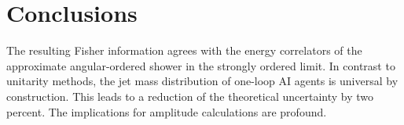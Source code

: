 \section{Conclusions}\label{sec:conclusions}

The resulting Fisher information agrees with the energy correlators of
the approximate angular-ordered shower in the strongly ordered limit. In
contrast to unitarity methods, the jet mass distribution of one-loop AI
agents is universal by construction. This leads to a reduction of the
theoretical uncertainty by two percent. The implications for amplitude
calculations are profound.

